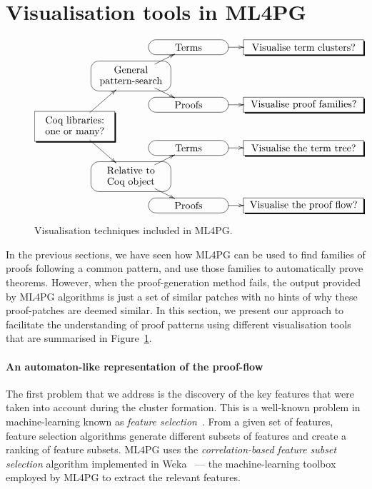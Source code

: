 \section{Visualisation tools in ML4PG}\label{sec:visualisation}



\begin{figure}

$$
\xy0;/r.12pc/:
*[o]=<80pt,30pt>\hbox{\txt{Coq libraries:\\one or many?}}="a"*\frm<8pt>{-,},
(40,35)*[o]=<80pt,30pt>\hbox{\txt{General\\pattern-search}}="r"*\frm<8pt>{-},
(40,-35)*[o]=<80pt,30pt>\hbox{\txt{Relative to\\ Coq object}}="b"*\frm<8pt>{-},
(80,55)*[o]=<80pt,15pt>\hbox{\txt{Terms}}="c"*\frm<8pt>{-},
(80,15)*[o]=<80pt,15pt>\hbox{\txt{Proofs}}="d"*\frm<8pt>{-},
(80,-15)*[o]=<80pt,15pt>\hbox{\txt{Terms}}="e"*\frm<8pt>{-},
(80,-55)*[o]=<80pt,15pt>\hbox{\txt{Proofs}}="f"*\frm<8pt>{-},
(160,55)*[o]=<120pt,15pt>\hbox{\txt{Visualise term clusters?}}="g"*\frm<8pt>{-,},
(160,15)*[o]=<120pt,15pt>\hbox{\txt{Visualise proof families?}}="h"*\frm<8pt>{-,},
(160,-15)*[o]=<120pt,15pt>\hbox{\txt{Visualise the term tree?}}="i"*\frm<8pt>{-,},
(160,-55)*[o]=<120pt,15pt>\hbox{\txt{Visualise the proof flow?}}="j"*\frm<8pt>{-,},
"a";"b" **\dir{-} ?>*\dir{>},
"a";"r" **\dir{-} ?>*\dir{>},
"r";"c" **\dir{-} ?>*\dir{>},
"r";"d" **\dir{-} ?>*\dir{>},
"b";"e" **\dir{-} ?>*\dir{>},
"b";"f" **\dir{-} ?>*\dir{>},
"c";"g" **\dir{-} ?>*\dir{>},
"d";"h" **\dir{-} ?>*\dir{>},
"e";"i" **\dir{-} ?>*\dir{>},
"f";"j" **\dir{-} ?>*\dir{>},
\endxy
$$
\caption{Visualisation techniques included in ML4PG.}\label{fig:visualisation}
\end{figure}


In the previous sections, we have seen how ML4PG can be used to find families of proofs following
a common pattern, and use those families to automatically prove theorems. However, when the proof-generation
method fails, the output provided by ML4PG algorithms is just a set of similar patches with no hints of why
these proof-patches are deemed similar.
In this section, we present our approach to facilitate the understanding of proof patterns using different visualisation tools
that are summarised in Figure~\ref{fig:visualisation}.

\paragraph{An automaton-like representation of the proof-flow}
The first problem that we address is the discovery of the key features that were taken
into account during the cluster formation. This is a well-known problem in machine-learning
known as \emph{feature selection}~\cite{Bishop}. From a given set of features, feature selection algorithms
generate different subsets of features and create a ranking of feature subsets.
ML4PG uses the \emph{correlation-based feature subset selection} algorithm implemented in Weka~\cite{Weka}
--- the machine-learning toolbox employed by ML4PG to extract the relevant features.

